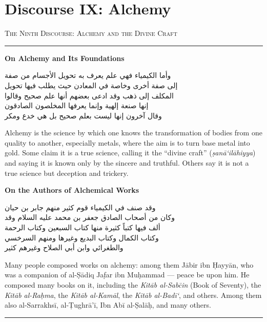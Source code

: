 \documentclass[11pt,a4paper]{article}
\newcommand{\longline}{\noindent\rule{\textwidth}{0.4pt}}
\newcommand{\ar}[1]{{\arabicfont\beginR #1\endR}}
\newcommand{\bilingual}[2]{%
  \noindent
  \begin{minipage}[t]{0.47\textwidth}
    \vspace{0pt}
    \begin{flushright}
    {\arabicfont\beginR #1\endR}
    \end{flushright}
  \end{minipage}%
  \hfill\vline\hfill
  \begin{minipage}[t]{0.47\textwidth}
    \vspace{0pt}
    #2
  \end{minipage}%
  \par\vspace{0.8em}
}
\newcommand{\bilingualsection}[2]{%
  \vspace{1em}%
  \noindent
  \begin{minipage}[t]{0.47\textwidth}
    \begin{flushright}
    \textsc{\color{sectioncolor}\ar{#1}}
    \end{flushright}
  \end{minipage}%
  \hfill
  \begin{minipage}[t]{0.47\textwidth}
    \textsc{\color{sectioncolor}#2}
  \end{minipage}%
  \par\vspace{0.5em}\hrule\vspace{0.8em}%
}
\newcommand{\bilingualsubsection}[2]{%
  \vspace{0.6em}%
  \noindent
  \begin{minipage}[t]{0.47\textwidth}
    \begin{flushright}
    \textbf{\color{sectioncolor}\ar{#1}}
    \end{flushright}
  \end{minipage}%
  \hfill
  \begin{minipage}[t]{0.47\textwidth}
    \textbf{\color{sectioncolor}#2}
  \end{minipage}%
  \par\vspace{0.4em}%
}
\begin{document}
\section{Discourse IX: Alchemy}
\label{sec:IX}

\bilingualsection{الفن التاسع في الكيمياء والصنعة الإلهية}{The Ninth Discourse: Alchemy and the Divine Craft}

\bilingualsubsection{في الكيمياء وأصولها}{On Alchemy and Its Foundations}

\bilingual
{وأما الكيمياء فهي علم يعرف به تحويل الأجسام من صفة\\
إلى صفة أخرى وخاصة في المعادن حيث يطلب فيها تحويل\\
المكلف إلى ذهب وقد ادعى بعضهم أنها علم صحيح وقالوا\\
إنها صنعة إلهية وإنما يعرفها المخلصون الصادقون\\
وقال آخرون إنها ليست بعلم صحيح بل هي خدع ومكر}
{Alchemy is the science by which one knows the transformation of bodies
from one quality to another, especially metals, where the aim is to turn
base metal into gold. Some claim it is a true science, calling it the
``divine craft'' (\textit{\d{s}an\={a}\textquoteleft il\=ahiyya}) and saying
it is known only by the sincere and truthful. Others say it is not a
true science but deception and trickery.}

\bilingualsubsection{في المؤلفين في الكيمياء}{On the Authors of Alchemical Works}

\bilingual
{وقد صنف في الكيمياء قوم كثير منهم جابر بن حيان\\
وكان من أصحاب الصادق جعفر بن محمد عليه السلام وقد\\
ألف فيها كتباً كثيرة منها كتاب السبعين وكتاب الرحمة\\
وكتاب الكمال وكتاب البديع وغيرها ومنهم السرخسي\\
والطغرائي وابن أبي الصلاح وغيرهم كثير}
{Many people composed works on alchemy: among them J\=abir ibn
\d{H}ayy\=an, who was a companion of al-\d{S}\=adiq Ja\d{far} ibn
Mu\d{h}ammad — peace be upon him. He composed many books on it,
including the \textit{Kit\=ab al-Sab\={c}in} (Book of Seventy), the
\textit{Kit\=ab al-Ra\d{h}ma}, the \textit{Kit\=ab al-Kam\=al}, the
\textit{Kit\=ab al-Bad\={i}\textquoteleft}, and others. Among them also
al-Sarrakhs\=i, al-\d{T}ughr\=a'\=i, Ibn Ab\=i al-\d{S}al\=a\d{h}, and
many others.}

\vspace{1em}
\longline

\newpage
\end{document}
